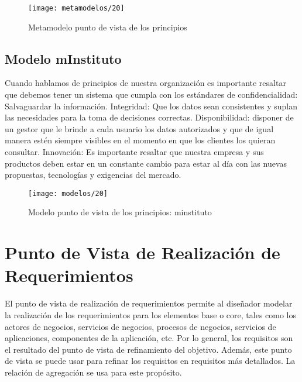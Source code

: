    \begin{figure}[H]
   	\centering
   	\texttt{[image: metamodelos/20]}
   	\captionsetup{width=.95\textwidth}
   	\caption{Metamodelo punto de vista de los principios}
   	\label{figura20}
   \end{figure}
   
   \subsection{Modelo mInstituto}
   Cuando hablamos de principios de nuestra organización es importante resaltar que debemos tener un sistema que cumpla con los estándares de confidencialidad: Salvaguardar la información. Integridad: Que los datos sean consistentes y suplan las necesidades para la toma de decisiones correctas. Disponibilidad: disponer de un gestor que le brinde a cada usuario los datos autorizados y que de igual manera estén siempre visibles en el momento en que los clientes los quieran consultar. Innovación: Es importante resaltar que nuestra empresa y sus productos deben estar en un constante cambio para estar al día con las nuevas propuestas, tecnologías y exigencias del mercado.
   \begin{figure}[H]
   	\centering
   	\texttt{[image: modelos/20]}
   	\captionsetup{width=.95\textwidth}
   	\caption{Modelo punto de vista de los principios: minstituto}
   	\label{modelo20}
   \end{figure}
   
\section{Punto de Vista de Realización de Requerimientos}
El punto de vista de realización de requerimientos permite al diseñador modelar la realización de los requerimientos para los elementos base o core, tales como los actores de negocios, servicios de negocios, procesos de negocios, servicios de aplicaciones, componentes de la aplicación, etc. Por lo general, los requisitos son el resultado del punto de vista de refinamiento del objetivo. Además, este punto de vista se puede usar para refinar los requisitos en requisitos más detallados. La relación de agregación se usa para este propósito.
   
